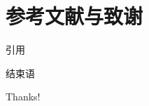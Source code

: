 \documentclass[aspectratio=169]{beamer}
\begin{document}
\section{参考文献与致谢}

\begin{frame}[allowframebreaks]{引用}
    \tiny
    
\end{frame}

\begin{frame}{结束语}
    \begin{center}
        {\Huge\calligra Thanks!}
    \end{center}
\end{frame}
\end{document}
